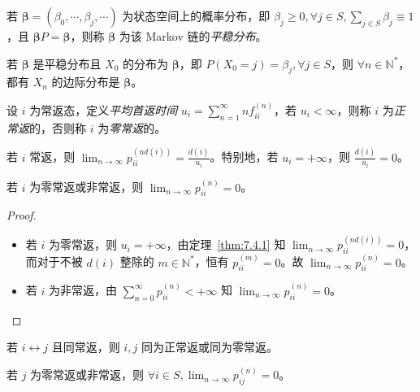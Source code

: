 \documentclass[../main.tex]{subfiles}
\begin{document}
\begin{definition}\label{def:7.4.1}
    若 $\boldsymbol\beta=(\beta_0,\cdots,\beta_j,\cdots)$ 为状态空间上的概率分布，即 $\beta_j\geq0,\forall j\in S,\sum_{j\in S}\beta_j\equiv1$，且 $\boldsymbol\beta P=\boldsymbol\beta$，则称 $\boldsymbol\beta$ 为该 Markov 链的\emph{平稳分布}。
\end{definition}

若 $\boldsymbol\beta$ 是平稳分布且 $X_0$ 的分布为 $\boldsymbol\beta$，即 $P(X_0=j)=\beta_j,\forall j\in S$，则 $\forall n\in\mathbb N^*$，都有 $X_n$ 的边际分布是 $\boldsymbol\beta$。

\begin{definition}\label{def:7.4.2}
    设 $i$ 为常返态，定义\emph{平均首返时间} $u_i=\sum_{n=1}^\infty nf_{ii}^{(n)}$，若 $u_i<\infty$，则称 $i$ 为\emph{正常返}的，否则称 $i$ 为\emph{零常返}的。
\end{definition}

\begin{theorem}\label{thm:7.4.1}
    若 $i$ 常返，则 $\lim_{n\rightarrow\infty}p_{ii}^{(nd(i))}=\frac{d(i)}{u_i}$。特别地，若 $u_i=+\infty$，则 $\frac{d(i)}{u_i}=0$。
\end{theorem}

\begin{theorem}\label{thm:7.4.2}
    若 $i$ 为零常返或非常返，则 $\lim_{n\rightarrow\infty}p_{ii}^{(n)}=0$。
\end{theorem}

\begin{proof}
    \mbox{}
    \begin{itemize}
        \item 若 $i$ 为零常返，则 $u_i=+\infty$，由定理~\ref{thm:7.4.1} 知 $\lim_{n\rightarrow\infty}p_{ii}^{(nd(i))}=0$，而对于不被 $d(i)$ 整除的 $m\in\mathbb N^*$，恒有 $p_{ii}^{(m)}=0$。故 $\lim_{n\rightarrow\infty}p_{ii}^{(n)}=0$。
        \item 若 $i$ 为非常返，由 $\sum_{n=0}^\infty p_{ii}^{(n)}<+\infty$ 知 $\lim_{n\rightarrow\infty}p_{ii}^{(n)}=0$。
    \end{itemize}
\end{proof}

\begin{theorem}\label{thm:7.4.3}
    若 $i\leftrightarrow j$ 且同常返，则 $i,j$ 同为正常返或同为零常返。
\end{theorem}

\begin{theorem}\label{thm:7.4.4}
    若 $j$ 为零常返或非常返，则 $\forall i\in S,\lim_{n\rightarrow\infty}p_{ij}^{(n)}=0$。
\end{theorem}
\end{document}
